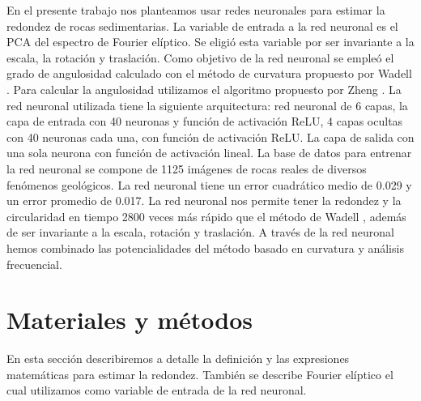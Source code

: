 \documentclass[conference]{IEEEtran}
\begin{document}
En el presente trabajo nos planteamos usar redes neuronales para estimar la redondez de rocas sedimentarias. La variable de entrada a la red neuronal es el PCA del espectro de Fourier elíptico. Se eligió esta variable por ser invariante a la escala, la rotación y traslación.  Como objetivo de la red neuronal se empleó el grado de angulosidad calculado con el método de curvatura propuesto por Wadell \cite{b7}. Para calcular la angulosidad utilizamos el algoritmo propuesto por Zheng \cite{b8}. La red neuronal utilizada tiene la siguiente arquitectura: red  neuronal de 6 capas, la capa de entrada con 40 neuronas y función de activación ReLU, 4 capas ocultas con 40 neuronas cada una, con función de activación ReLU. La capa de salida con una sola neurona con función de activación lineal. La base de datos para entrenar la red neuronal se compone de 1125 imágenes de rocas reales de diversos fenómenos geológicos. La red neuronal tiene un error cuadrático medio de 0.029 y un error promedio de 0.017. La red neuronal nos permite tener la redondez y la circularidad en tiempo 2800 veces más rápido que el método de Wadell \cite{b7}, además de ser invariante a la escala, rotación y traslación. A través de la red neuronal hemos combinado las potencialidades del método basado en curvatura y análisis frecuencial. 




\section{Materiales y métodos}
En esta sección describiremos a detalle la definición y las expresiones matemáticas para estimar la redondez. También se describe Fourier elíptico el cual utilizamos como variable de entrada de la red neuronal. 

%
%
\end{document}
